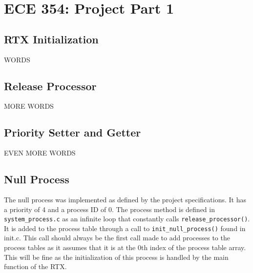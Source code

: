 \documentclass[oneside]{article}
\begin{document}
\lstset{language=C}
\section*{ECE 354: Project Part 1}
\subsection*{RTX Initialization} 
WORDS

\subsection*{Release Processor}
MORE WORDS

\subsection*{Priority Setter and Getter}
EVEN MORE WORDS

\subsection*{Null Process}
The null process was implemented as defined by the project specifications. It
has a priority of 4 and a process ID of 0. The process method is defined in
\texttt{system\_process.c} as an infinite loop that constantly calls
\texttt{release\_processor()}. It is added to the process table through a call to
\texttt{init\_null\_process()} found in init.c. This call should always be the first
call made to add processes to the process tables as it assumes that it is at
the 0th index of the process table array. This will be fine as the
initialization of this process is handled by the main function of the RTX.
\end{document}
